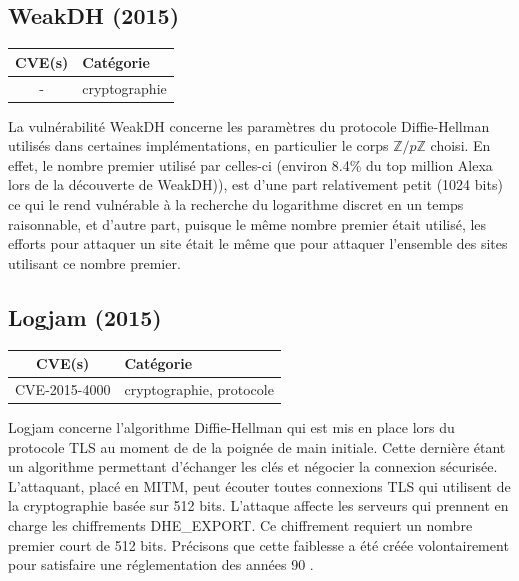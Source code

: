 

\subsection{WeakDH (2015)}

\begin{tabularx}{0.96\textwidth}{|c|X|}
  \hline
  \textbf{CVE(s)} & \textbf{Catégorie} \\
  \hline
  - & cryptographie \\
  \hline
\end{tabularx}

\vspace{1em}

La vulnérabilité WeakDH concerne les paramètres du protocole Diffie-Hellman utilisés dans certaines implémentations, en particulier le corps $\mathbb{Z}/p\mathbb{Z}$ choisi. En effet, le nombre premier utilisé par celles-ci (environ 8.4\% du top million Alexa lors de la découverte de WeakDH)), est d'une part relativement petit (1024 bits) ce qui le rend vulnérable à la recherche du logarithme discret en un temps raisonnable, et d'autre part, puisque le même nombre premier était utilisé, les efforts pour attaquer un site était le même que pour attaquer l'ensemble des sites utilisant ce nombre premier\cite{weakdh}.




\subsection{Logjam (2015)}

\begin{tabularx}{0.96\textwidth}{|c|X|}
  \hline
  \textbf{CVE(s)} & \textbf{Catégorie} \\
  \hline
  CVE-2015-4000 & cryptographie, protocole \\
  \hline
\end{tabularx}

\vspace{1em}

Logjam concerne l'algorithme Diffie-Hellman qui est mis en place lors du protocole TLS au moment de de la poignée de main initiale. Cette dernière étant un algorithme permettant d'échanger les clés et négocier la connexion sécurisée. L'attaquant, placé en MITM, peut écouter toutes connexions TLS qui utilisent de la cryptographie basée sur 512 bits. L'attaque affecte les serveurs qui prennent en charge les chiffrements DHE\_EXPORT. Ce chiffrement requiert un nombre premier court de 512 bits. Précisons que cette faiblesse a été créée volontairement pour satisfaire une réglementation des années 90
\cite{logjam}.


